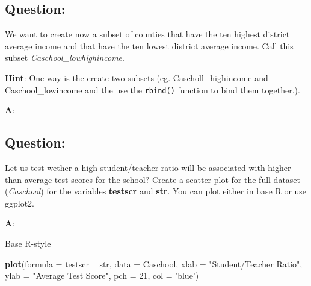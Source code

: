 \documentclass[12pt,]{article}
\newenvironment{Shaded}{\begin{snugshade}}{\end{snugshade}}
\newcommand{\DataTypeTok}[1]{\textcolor[rgb]{0.13,0.29,0.53}{#1}}
\newcommand{\DecValTok}[1]{\textcolor[rgb]{0.00,0.00,0.81}{#1}}
\newcommand{\KeywordTok}[1]{\textcolor[rgb]{0.13,0.29,0.53}{\textbf{#1}}}
\newcommand{\NormalTok}[1]{#1}
\newcommand{\OperatorTok}[1]{\textcolor[rgb]{0.81,0.36,0.00}{\textbf{#1}}}
\newcommand{\StringTok}[1]{\textcolor[rgb]{0.31,0.60,0.02}{#1}}
\begin{document}
\hypertarget{question-7}{%
\subsection{Question:}\label{question-7}}

We want to create now a subset of counties that have the ten highest
district average income and that have the ten lowest district average
income. Call this subset \emph{Caschool\_lowhighincome}.

\textbf{Hint}: One way is the create two subsets (eg.
Cascholl\_highincome and Caschool\_lowincome and the use the
\texttt{rbind()} function to bind them together.).

\textbf{A}:

\begin{Shaded}
\end{Shaded}

\hypertarget{question-8}{%
\subsection{Question:}\label{question-8}}

Let us test wether a high student/teacher ratio will be associated with
higher-than-average test scores for the school? Create a scatter plot
for the full dataset (\emph{Caschool}) for the variables
\textbf{testscr} and \textbf{str}. You can plot either in base R or use
ggplot2.

\textbf{A}:

Base R-style

\begin{Shaded}
\begin{Highlighting}[]
\KeywordTok{plot}\NormalTok{(}\DataTypeTok{formula =}\NormalTok{ testscr }\OperatorTok{~}\StringTok{ }\NormalTok{str,}
     \DataTypeTok{data =}\NormalTok{ Caschool,}
     \DataTypeTok{xlab =} \StringTok{"Student/Teacher Ratio"}\NormalTok{,}
     \DataTypeTok{ylab =} \StringTok{"Average Test Score"}\NormalTok{, }\DataTypeTok{pch =} \DecValTok{21}\NormalTok{, }\DataTypeTok{col =} \StringTok{'blue'}\NormalTok{)}
\end{Highlighting}
\end{Shaded}
\end{document}
